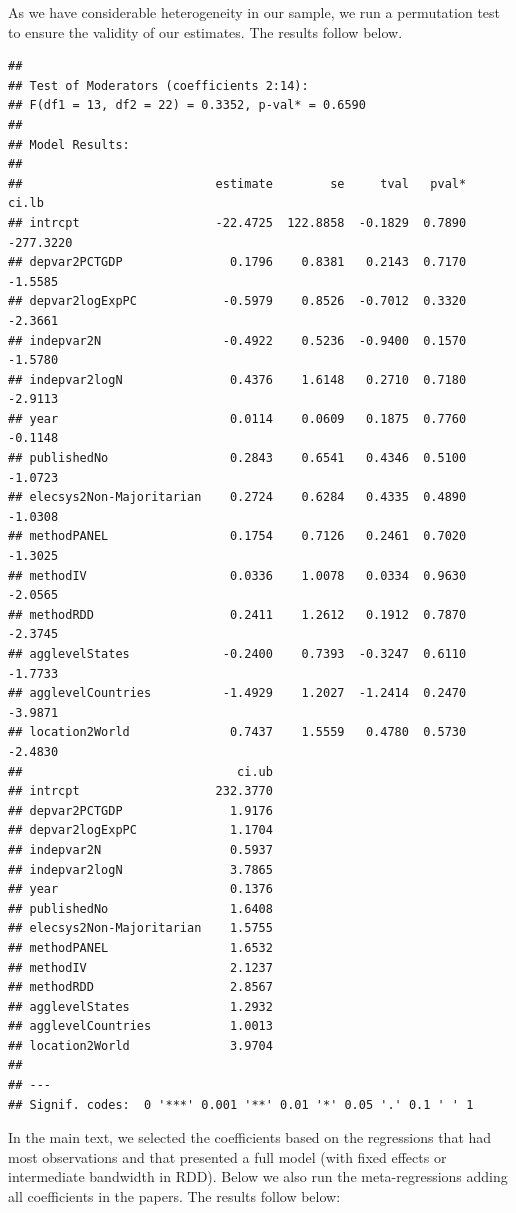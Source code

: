 \documentclass[
]{article}
\begin{document}
As we have considerable heterogeneity in our sample, we run a
permutation test to ensure the validity of our estimates. The results
follow below.

\begin{verbatim}
## 
## Test of Moderators (coefficients 2:14):
## F(df1 = 13, df2 = 22) = 0.3352, p-val* = 0.6590
## 
## Model Results:
## 
##                           estimate        se     tval   pval*      ci.lb 
## intrcpt                   -22.4725  122.8858  -0.1829  0.7890  -277.3220 
## depvar2PCTGDP               0.1796    0.8381   0.2143  0.7170    -1.5585 
## depvar2logExpPC            -0.5979    0.8526  -0.7012  0.3320    -2.3661 
## indepvar2N                 -0.4922    0.5236  -0.9400  0.1570    -1.5780 
## indepvar2logN               0.4376    1.6148   0.2710  0.7180    -2.9113 
## year                        0.0114    0.0609   0.1875  0.7760    -0.1148 
## publishedNo                 0.2843    0.6541   0.4346  0.5100    -1.0723 
## elecsys2Non-Majoritarian    0.2724    0.6284   0.4335  0.4890    -1.0308 
## methodPANEL                 0.1754    0.7126   0.2461  0.7020    -1.3025 
## methodIV                    0.0336    1.0078   0.0334  0.9630    -2.0565 
## methodRDD                   0.2411    1.2612   0.1912  0.7870    -2.3745 
## agglevelStates             -0.2400    0.7393  -0.3247  0.6110    -1.7733 
## agglevelCountries          -1.4929    1.2027  -1.2414  0.2470    -3.9871 
## location2World              0.7437    1.5559   0.4780  0.5730    -2.4830 
##                              ci.ub 
## intrcpt                   232.3770    
## depvar2PCTGDP               1.9176    
## depvar2logExpPC             1.1704    
## indepvar2N                  0.5937    
## indepvar2logN               3.7865    
## year                        0.1376    
## publishedNo                 1.6408    
## elecsys2Non-Majoritarian    1.5755    
## methodPANEL                 1.6532    
## methodIV                    2.1237    
## methodRDD                   2.8567    
## agglevelStates              1.2932    
## agglevelCountries           1.0013    
## location2World              3.9704    
## 
## ---
## Signif. codes:  0 '***' 0.001 '**' 0.01 '*' 0.05 '.' 0.1 ' ' 1
\end{verbatim}

In the main text, we selected the coefficients based on the regressions
that had most observations and that presented a full model (with fixed
effects or intermediate bandwidth in RDD). Below we also run the
meta-regressions adding all coefficients in the papers. The results
follow below:
\end{document}

